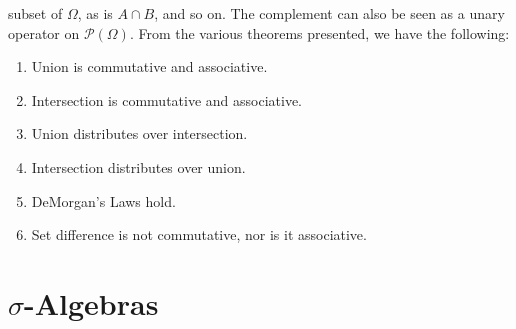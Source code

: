 \documentclass[crop=false,class=book,oneside]{standalone}
\begin{document}
            subset of $\Omega$, as is $A\cap{B}$, and so on.
            The complement can also be seen as a unary operator
            on $\mathcal{P}(\Omega)$. From the various theorems
            presented, we have the following:
            \begin{enumerate}
                \item Union is commutative and associative.
                \item Intersection is commutative and
                      associative.
                \item Union distributes over intersection.
                \item Intersection distributes over union.
                \item DeMorgan's Laws hold.
                \item Set difference is not commutative,
                      nor is it associative.
            \end{enumerate}
    \section{\texorpdfstring{$\sigma$}{Sigma}-Algebras}
\end{document}
